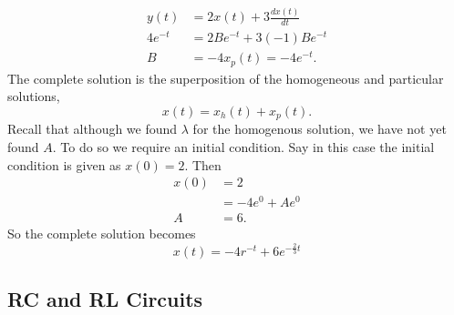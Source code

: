 \documentclass[nobib]{tufte-handout}
\begin{document}
\begin{align}
    y(t) &= 2x(t) + 3 \frac{dx(t)}{dt} \\
    4e^{-t} &= 2Be^{-t} + 3(-1)Be^{-t} \\
    B &= -4
    x_p(t) = -4e^{-t}.
\end{align}
The complete solution is the superposition 
of the homogeneous and particular solutions, 
\begin{equation}
    x(t) = x_h(t) + x_p(t).
\end{equation}
Recall that although we found $\lambda$ 
for the homogenous solution, we have not 
yet found $A$. To do so we require 
an initial condition. Say in this case 
the initial condition is given as 
$x(0) = 2$. Then 
\begin{align}
    x(0) &= 2 \\
    &= -4e^0 + Ae^0 \\
    A &= 6.
\end{align}
So the complete solution becomes 
\begin{equation}
    x(t) = -4r^{-t} + 6e^{-\frac{2}{3}t}
\end{equation}

\subsection{RC and RL Circuits}
\end{document}
